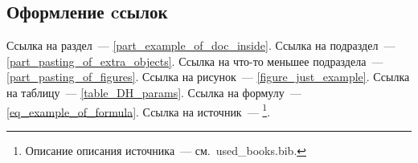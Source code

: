 \subsection{Оформление cсылок}\label{part_editing_of_refs}
Ссылка на раздел~--- \ref{part_example_of_doc_inside}.
Ссылка на подраздел~--- \ref{part_pasting_of_extra_objects}.
Ссылка на что-то меньшее подраздела~--- \ref{part_pasting_of_figures}.
Ссылка на рисунок~--- \ref{figure_just_example}.
Ссылка на таблицу~--- \ref{table_DH_params}.
Ссылка на формулу~--- \eqref{eq_example_of_formula}.
Ссылка на источник~--- \cite{UrcolaIROS08}\footnote{Описание описания источника~--- см.~used\_books.bib.}.
\newpage
